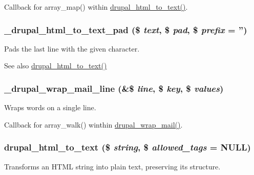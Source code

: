 Callback for array\_\-map() within \hyperlink{mail_8inc_a1d324056cce089d2fc06dedee5b6e92e}{drupal\_\-html\_\-to\_\-text()}. \hypertarget{mail_8inc_a54f26f0265b1eab148753bb7a72c3d09}{
\subsubsection[{\_\-drupal\_\-html\_\-to\_\-text\_\-pad}]{\setlength{\rightskip}{0pt plus 5cm}\_\-drupal\_\-html\_\-to\_\-text\_\-pad (\$ {\em text}, \/  \$ {\em pad}, \/  \$ {\em prefix} = {\ttfamily ''})}}
\label{mail_8inc_a54f26f0265b1eab148753bb7a72c3d09}
Pads the last line with the given character.

\begin{DoxySeeAlso}{See also}
\hyperlink{mail_8inc_a1d324056cce089d2fc06dedee5b6e92e}{drupal\_\-html\_\-to\_\-text()} 
\end{DoxySeeAlso}
\hypertarget{mail_8inc_a0bd2970cd3a1907c69945f82c22fedbf}{
\subsubsection[{\_\-drupal\_\-wrap\_\-mail\_\-line}]{\setlength{\rightskip}{0pt plus 5cm}\_\-drupal\_\-wrap\_\-mail\_\-line (\&\$ {\em line}, \/  \$ {\em key}, \/  \$ {\em values})}}
\label{mail_8inc_a0bd2970cd3a1907c69945f82c22fedbf}
Wraps words on a single line.

Callback for array\_\-walk() winthin \hyperlink{mail_8inc_a955ffecc70c15ab89079ea29557f7b41}{drupal\_\-wrap\_\-mail()}. \hypertarget{mail_8inc_a1d324056cce089d2fc06dedee5b6e92e}{
\subsubsection[{drupal\_\-html\_\-to\_\-text}]{\setlength{\rightskip}{0pt plus 5cm}drupal\_\-html\_\-to\_\-text (\$ {\em string}, \/  \$ {\em allowed\_\-tags} = {\ttfamily NULL})}}
\label{mail_8inc_a1d324056cce089d2fc06dedee5b6e92e}
Transforms an HTML string into plain text, preserving its structure.

